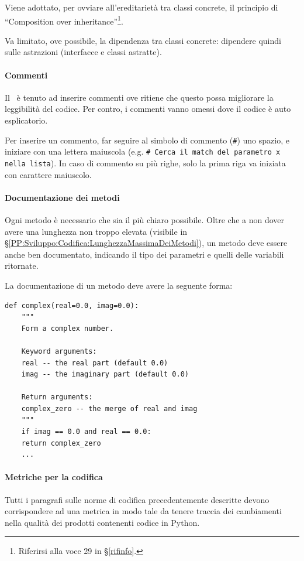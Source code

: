 		Viene adottato, per ovviare all'ereditarietà tra classi concrete, il principio di ``Composition over inheritance''\footnote{Riferirsi alla voce
		29
		 in \S\ref{rifinfo}.}.

		Va limitato, ove possibile, la dipendenza tra classi concrete: dipendere quindi sulle astrazioni (interfacce e classi astratte).

        \paragraph{Commenti}\label{PP:Sviluppo:Codifica:Commenti}
		Il \Progr\ è tenuto ad inserire commenti ove ritiene che questo possa migliorare la leggibilità del codice. Per contro, i commenti vanno
		omessi dove il codice è auto esplicatorio.\par
		Per inserire un commento, far seguire al simbolo di commento (\texttt{\#}) uno spazio, e iniziare con una lettera maiuscola (e.g.
		\texttt{\#\ Cerca il match del parametro x nella lista}). In caso di commento su più righe, solo la prima riga va iniziata con carattere
		maiuscolo.

        \paragraph{Documentazione dei metodi}\label{PP:Sviluppo:Codifica:DocumentazioneDeiMetodi}
        Ogni metodo è necessario che sia il più chiaro possibile. Oltre che a non dover avere una lunghezza non troppo elevata (visibile in \S\ref{PP:Sviluppo:Codifica:LunghezzaMassimaDeiMetodi}), un metodo deve essere anche ben documentato, indicando il tipo dei parametri e quelli delle variabili ritornate.

        La documentazione di un metodo deve avere la seguente forma:
\begin{verbatim}
def complex(real=0.0, imag=0.0):
    """
    Form a complex number.

    Keyword arguments:
    real -- the real part (default 0.0)
    imag -- the imaginary part (default 0.0)

    Return arguments:
    complex_zero -- the merge of real and imag
    """
    if imag == 0.0 and real == 0.0:
    return complex_zero
    ...
\end{verbatim}

        \paragraph{Metriche per la codifica}\label{PP:Sviluppo:MetricheCodifica}
        Tutti i paragrafi sulle norme di codifica precedentemente descritte devono corrispondere ad una metrica in modo tale da tenere traccia dei cambiamenti nella qualità dei prodotti contenenti codice in Python.

